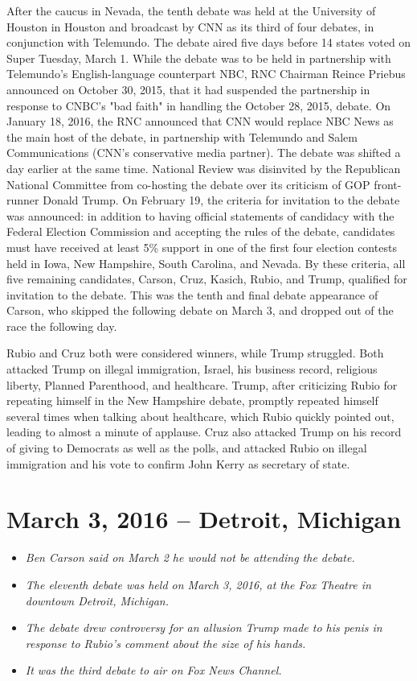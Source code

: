 After the caucus in Nevada, the tenth debate was held at the University
of Houston in Houston and broadcast by CNN as its third of four debates,
in conjunction with Telemundo. The debate aired five days before 14
states voted on Super Tuesday, March 1. While the debate was to be held
in partnership with Telemundo's English-language counterpart NBC, RNC
Chairman Reince Priebus announced on October 30, 2015, that it had
suspended the partnership in response to CNBC's "bad faith" in handling
the October 28, 2015, debate. On January 18, 2016, the RNC announced
that CNN would replace NBC News as the main host of the debate, in
partnership with Telemundo and Salem Communications (CNN's conservative
media partner). The debate was shifted a day earlier at the same time.
National Review was disinvited by the Republican National Committee from
co-hosting the debate over its criticism of GOP front-runner Donald
Trump. On February 19, the criteria for invitation to the debate was
announced: in addition to having official statements of candidacy with
the Federal Election Commission and accepting the rules of the debate,
candidates must have received at least 5\% support in one of the first
four election contests held in Iowa, New Hampshire, South Carolina, and
Nevada. By these criteria, all five remaining candidates, Carson, Cruz,
Kasich, Rubio, and Trump, qualified for invitation to the debate. This
was the tenth and final debate appearance of Carson, who skipped the
following debate on March 3, and dropped out of the race the following
day.

Rubio and Cruz both were considered winners, while Trump struggled. Both
attacked Trump on illegal immigration, Israel, his business record,
religious liberty, Planned Parenthood, and healthcare. Trump, after
criticizing Rubio for repeating himself in the New Hampshire debate,
promptly repeated himself several times when talking about healthcare,
which Rubio quickly pointed out, leading to almost a minute of applause.
Cruz also attacked Trump on his record of giving to Democrats as well as
the polls, and attacked Rubio on illegal immigration and his vote to
confirm John Kerry as secretary of state.

\section{March 3, 2016 -- Detroit,
Michigan}\label{march-3-2016-detroit-michigan}

\begin{itemize}
\item
  \emph{Ben Carson said on March 2 he would not be attending the
  debate.}
\item
  \emph{The eleventh debate was held on March 3, 2016, at the Fox
  Theatre in downtown Detroit, Michigan.}
\item
  \emph{The debate drew controversy for an allusion Trump made to his
  penis in response to Rubio's comment about the size of his hands.}
\item
  \emph{It was the third debate to air on Fox News Channel.}
\end{itemize}

